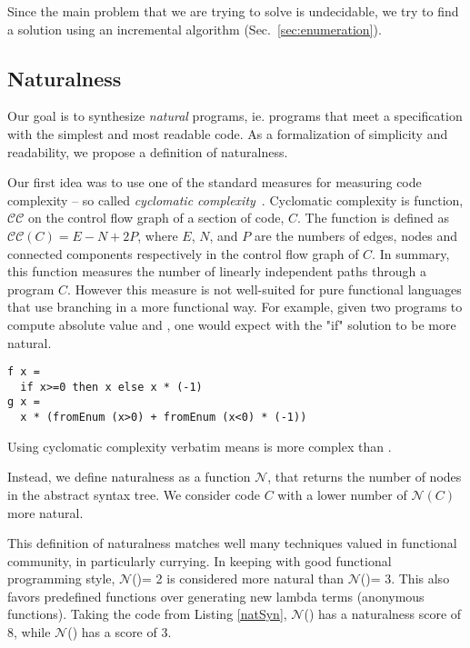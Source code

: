 Since the main problem that we are trying to solve is undecidable, we try to find a solution using an incremental algorithm (Sec.~\ref{sec:enumeration}).
 

\subsection{Naturalness}
\label{sec:naturalness}

Our goal is to synthesize \textit{natural} programs, ie. programs that meet a specification with the simplest and most readable code.
As a formalization of simplicity and readability, we propose a definition of naturalness.

Our first idea was to use one of the standard measures for measuring code complexity -- so called {\emph{cyclomatic complexity}}~\cite{McCabe:1976:CM:800253.807712}.
Cyclomatic complexity is function, $\mathcal{CC}$ on the control flow graph of a section of code, $C$.
The function is defined as $\mathcal{CC}(C) = E − N + 2P$, where $E$, $N$, and $P$ are the numbers of edges, nodes and connected components respectively in the control flow graph of $C$.
In summary, this function measures the number of linearly independent paths through a program $C$.
However this measure is not well-suited for pure functional languages that use branching in a more functional way.
For example, given two programs to compute absolute value  and , one would expect  with the "if" solution to be more natural.
\begin{lstlisting}
f x =
  if x>=0 then x else x * (-1)
g x = 
  x * (fromEnum (x>0) + fromEnum (x<0) * (-1))
\end{lstlisting}
Using cyclomatic complexity verbatim means  is more complex than .

Instead, we define naturalness as a function $\mathcal{N}$, that returns the number of nodes in the abstract syntax tree. We consider code $C$ with a lower 
number of $\mathcal{N}(C)$ more natural.

This definition of naturalness matches well many techniques valued in functional community, in particularly 
currying.
In keeping with good functional programming style, 
$\mathcal{N}$()= 2 is considered more natural than $\mathcal{N}$()= 3.
This also favors predefined functions over generating new lambda terms (anonymous functions).
Taking the code from Listing \ref{natSyn}, $\mathcal{N}$() has a naturalness score of 8, while $\mathcal{N}$() has a score of 3.

